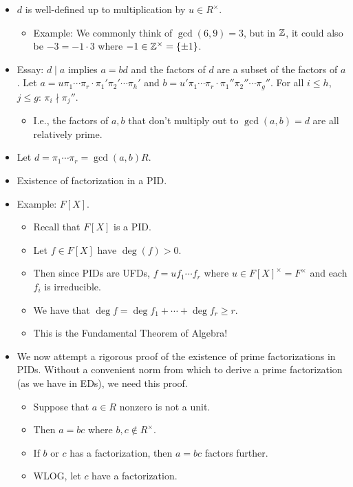 \documentclass[../notes.tex]{subfiles}
\begin{document}
\begin{itemize}
\begin{enumerate}[label={(\roman*)}]
    \end{enumerate}
    \item $d$ is well-defined up to multiplication by $u\in R^\times$.
    \begin{itemize}
        \item Example: We commonly think of $\gcd(6,9)=3$, but in $\mathbb{Z}$, it could also be $-3=-1\cdot 3$ where $-1\in\mathbb{Z}^\times=\{\pm 1\}$.
    \end{itemize}
    \item Essay: $d\mid a$ implies $a=bd$ and the factors of $d$ are a subset of the factors of $a$. Let $a=u\pi_1\cdots\pi_r\cdot\pi_1'\pi_2'\cdots\pi_h'$ and $b=u'\pi_1\cdots\pi_r\cdot\pi_1''\pi_2''\cdots\pi_g''$. For all $i\leq h$, $j\leq g$: $\pi_i\nmid\pi_j''$.
    \begin{itemize}
        \item I.e., the factors of $a,b$ that don't multiply out to $\gcd(a,b)=d$ are all relatively prime.
    \end{itemize}
    \item Let $d=\pi_1\cdots\pi_r=\gcd(a,b)R$.
    \item Existence of factorization in a PID.
    \item Example: $F[X]$.
    \begin{itemize}
        \item Recall that $F[X]$ is a PID.
        \item Let $f\in F[X]$ have $\deg(f)>0$.
        \item Then since PIDs are UFDs, $f=uf_1\cdots f_r$ where $u\in F[X]^\times=F^\times$ and each $f_i$ is irreducible.
        \item We have that $\deg f=\deg f_1+\cdots+\deg f_r\geq r$.
        \item This is the Fundamental Theorem of Algebra!
    \end{itemize}
    \item We now attempt a rigorous proof of the existence of prime factorizations in PIDs. Without a convenient norm from which to derive a prime factorization (as we have in EDs), we need this proof.
    \begin{itemize}
        \item Suppose that $a\in R$ nonzero is not a unit.
        \item Then $a=bc$ where $b,c\notin R^\times$.
        \item If $b$ or $c$ has a factorization, then $a=bc$ factors further.
        \item WLOG, let $c$ have a factorization.

\end{itemize}
\end{itemize}
\end{document}
